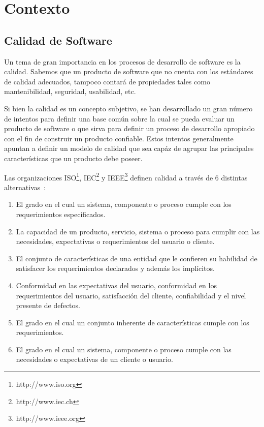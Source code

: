 
\chapter{Contexto}

\section{Calidad de Software}
Un tema de gran importancia en los procesos de desarrollo de software es la calidad.
Sabemos que un producto de software que no cuenta con los estándares de
calidad adecuados, tampoco contará de propiedades tales como mantenibilidad, seguridad, 
usabilidad, etc.

Si bien la calidad es un concepto subjetivo, se han desarrollado un gran
número de intentos para definir una base común sobre la cual se pueda evaluar un producto 
de software o que sirva para definir un proceso de desarrollo apropiado con el fin de construir
un producto confiable. Estos intentos generalmente apuntan a definir un modelo
de calidad que sea capáz de agrupar las principales características que un producto debe poseer.

Las organizaciones ISO\footnote{http://www.iso.org}, IEC\footnote{http://www.iec.ch} y IEEE\footnote{http://www.ieee.org} 
definen calidad a través de 6 distintas alternativas~\cite{5276043}:
\begin{enumerate}
    \item El grado en el cual un sistema, componente o proceso cumple con los requerimientos especificados.
    \item La capacidad de un producto, servicio, sistema o proceso para cumplir con las necesidades, expectativas
    o requerimientos del usuario o cliente.
    \item El conjunto de características de una entidad que le confieren su habilidad de satisfacer los requerimientos
    declarados y además los implícitos.
    \item Conformidad en las expectativas del usuario, conformidad en los requerimientos del usuario, satisfacción del cliente,
    confiabilidad y el nivel presente de defectos.
    \item El grado en el cual un conjunto inherente de características cumple con los requerimientos.
    \item El grado en el cual un sistema, componente o proceso cumple con las necesidades o expectativas de un cliente o usuario.
\end{enumerate}

